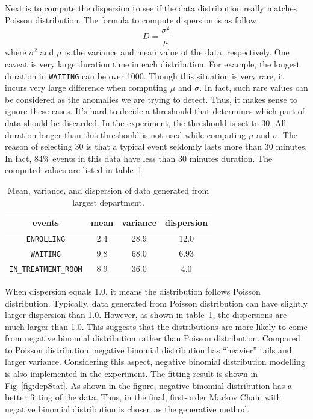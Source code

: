 Next is to compute the dispersion to see if the data distribution really matches Poisson distribution. The formula to compute dispersion is as follow
\begin{equation*}
	D = \frac{\sigma^2}{\mu}
\end{equation*}
where $\sigma^2$ and $\mu$ is the variance and mean value of the data, respectively. One caveat is very large duration time in each distribution. For example, the longest duration in \texttt{WAITING} can be over 1000. Though this situation is very rare, it incurs very large difference when computing $\mu$ and $\sigma$. In fact, such rare values can be considered as the anomalies we are trying to detect. Thus, it makes sense to ignore these cases. It's hard to decide a threshould that determines which part of data should be discarded. In the experiment, the threshould is set to 30. All duration longer than this threshould is not used while computing $\mu$ and $\sigma$. The reason of selecting 30 is that a typical event seldomly lasts more than 30 minutes. In fact, $84\%$ events in this data have less than 30 minutes duration. The computed values are listed in table~\ref{tab:dispersion}
\begin{table}[!ht]
	\begin{center}
		\begin{tabular}{|c|c|c|c|}
			\hline
			events & mean & variance & dispersion \\ \hline
			\texttt{ENROLLING}	& 2.4 & 28.9 & 12.0 \\ \hline
			\texttt{WAITING} & 9.8 & 68.0 & 6.93 \\ \hline
			\texttt{IN\_TREATMENT\_ROOM} & 8.9 & 36.0 & 4.0 \\ 
			\hline
		\end{tabular}
	\end{center}
	\caption{Mean, variance, and dispersion of data generated from largest department.}
	\label{tab:dispersion}
\end{table}
When dispersion equals 1.0, it means the distribution follows Poisson distribution. Typically, data generated from Poisson distribution can have slightly larger dispersion than 1.0. However, as shown in table~\ref{tab:dispersion}, the dispersions are much larger than 1.0. This suggests that the distributions are more likely to come from negative binomial distribution rather than Poisson distribution. Compared to Poisson distribution, negative binomial distribution has ``heavier'' tails and larger variance. Considering this aspect, negative binomial distribution modelling is also implemented in the experiment. The fitting result is shown in Fig~\ref{fig:depStat}. As shown in the figure, negative binomial distribution has a better fitting of the data. Thus, in the final, first-order Markov Chain with negative binomial distribution is chosen as the generative method.
